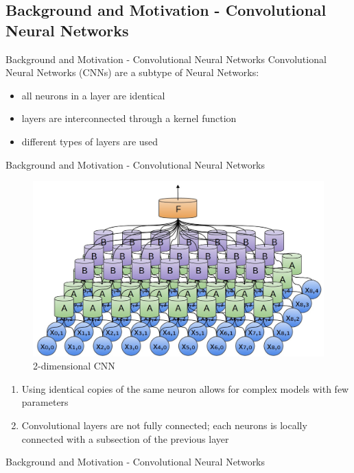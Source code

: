 \documentclass[12pt]{beamer}
\begin{document}
\subsection{Background and Motivation - Convolutional Neural Networks}
\begin{frame}{Background and Motivation - Convolutional Neural Networks}
Convolutional Neural Networks (CNNs) are a subtype of Neural Networks:
  \begin{itemize}
     \item all neurons in a layer are identical 
     \item layers are interconnected through a kernel function
     \item different types of layers are used %
  \end{itemize}
\end{frame}
\begin{frame}{Background and Motivation - Convolutional Neural Networks}
\begin{figure}
\centering
\includegraphics[width = 0.4\linewidth]{images/convexample.jpg}
\caption{2-dimensional CNN}
\label{fig:principle}
\end{figure}
\begin{enumerate}
\item Using identical copies of the same neuron allows for complex models with few parameters
\item Convolutional layers are not fully connected; each neurons is locally connected with a subsection of the previous layer
\end{enumerate}
\end{frame}
\begin{frame}{Background and Motivation - Convolutional Neural Networks}

\end{frame}
\end{document}
